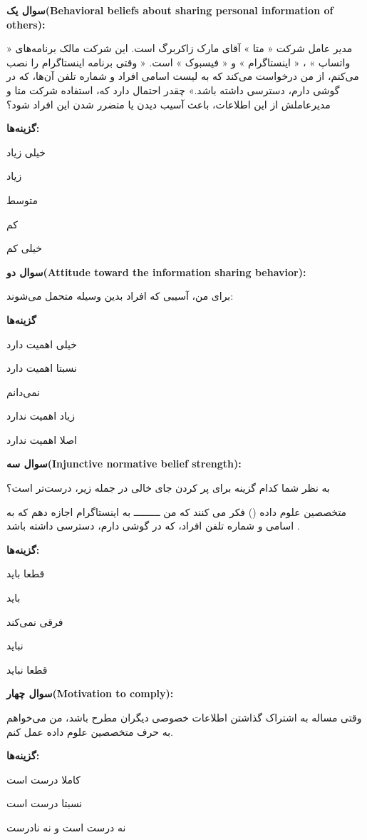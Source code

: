 \textbf{سوال یک(\gls{Behavioral beliefs about sharing personal information of others}):}

مدیر عامل شرکت « متا » آقای مارک زاکربرگ است. این شرکت مالک برنامه‌های « واتساپ » ، « اینستاگرام » و « فیسبوک » است.
« وقتی برنامه اینستاگرام را نصب می‌کنم، از من درخواست می‌کند که به لیست اسامی افراد و شماره تلفن‌ آن‌ها، که در گوشی دارم، دسترسی داشته باشد.»
چقدر احتمال دارد که، استفاده شرکت متا و مدیر‌عاملش از این اطلاعات، باعث آسیب‌ دیدن یا متضرر شدن این افراد شود؟ 

\textbf{گزینه‌ها:}

خیلی زیاد

زیاد

متوسط

کم

خیلی کم

\textbf{سوال دو(\gls{Attitude toward the information sharing behavior}):}

برای من، آسیبی که افراد بدین وسیله متحمل می‌شوند: 

\textbf{گزینه‌ها}

خیلی اهمیت دارد

نسبتا اهمیت دارد

نمی‌دانم

زیاد اهمیت ندارد

اصلا اهمیت ندارد



\textbf{سوال سه(\gls{Injunctive normative belief strength}):}


به نظر شما کدام گزینه برای پر کردن جای خالی در جمله زیر، درست‌تر است؟

متخصصین علوم داده
()
 فکر می کنند که من ـــــــــ به اینستاگرام اجازه دهم که به اسامی و شماره تلفن‌ افراد، که در گوشی دارم، دسترسی داشته باشد
\!.


\textbf{گزینه‌ها:}

قطعا باید

باید

فرقی نمی‌کند

نباید

قطعا نباید

\textbf{سوال چهار(\gls{Motivation to comply}):}

وقتی مساله به اشتراک گذاشتن اطلاعات خصوصی دیگران مطرح باشد، من می‌خواهم به حرف متخصصین علوم داده عمل کنم. 

\textbf{گزینه‌ها:}

کاملا درست است

نسبتا درست است

نه درست است و نه نادرست

